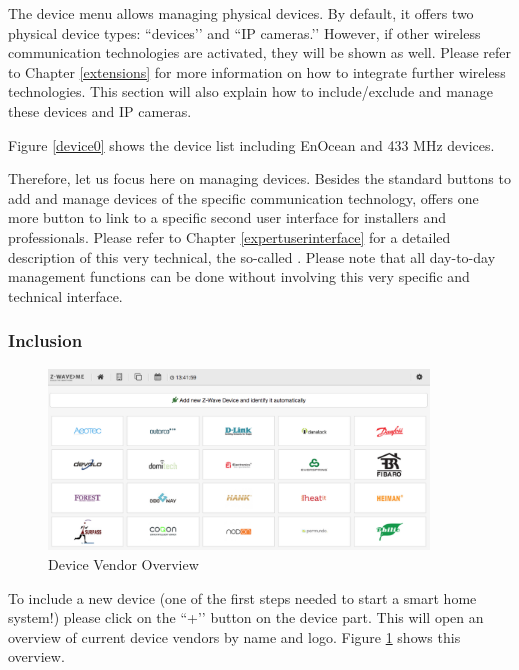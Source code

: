 The device menu allows managing physical devices. By default, it offers two physical 
device types: ``\zwave devices’’ and ``IP cameras.’’ However, if other wireless communication 
technologies are activated, they will be shown as well. Please refer to 
Chapter \ref{extensions} for more information on how to integrate further 
wireless technologies.   This section will also explain how to include/exclude and manage 
these devices and IP cameras.

Figure \ref{device0} shows the device list including EnOcean and 433 MHz devices.

Therefore, let us focus here on managing \zwave devices. Besides the standard buttons 
to add and manage devices of the specific communication technology, \zwave offers one
 more button to link to a specific second \zwave user interface for installers and professionals.
Please refer to Chapter \ref{expertuserinterface} for a detailed description of this very 
technical, the so-called \zweui. Please note that all day-to-day management functions 
can be done without involving this very specific and technical interface.

\subsubsection{Inclusion}
\label{inclusion}

\begin{figure}
\begin{center}
\includegraphics[width=0.9\textwidth]{pngs/cap4/device1.png}
\caption{\zwave Device Vendor Overview}
\label{device1}
\end{center}
\end{figure}

To include a new \zwave device (one of the first steps needed to start a smart home 
system!) please click on the ``+’’ button on the \zwave device part. This will open an 
overview of current \zwave device vendors by name and logo. Figure \ref{device1} 
shows this overview.

